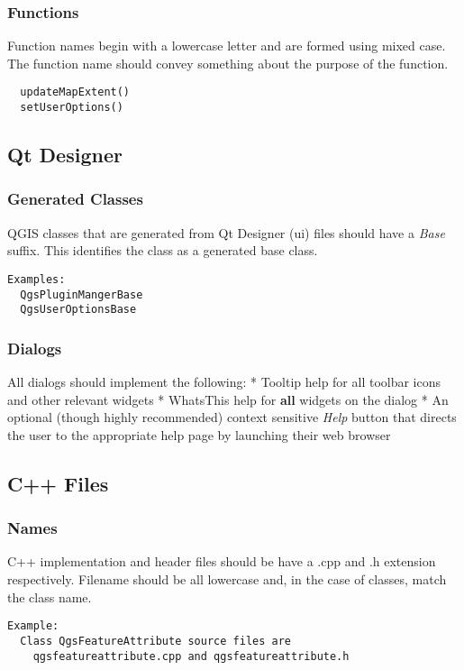 \subsubsection{Functions}
Function names begin with a lowercase letter and are formed using mixed case.
The function name should convey something about the purpose of the function.

\begin{verbatim}
  updateMapExtent()
  setUserOptions()
\end{verbatim}

\subsection{Qt Designer}
\subsubsection{Generated Classes}
QGIS classes that are generated from Qt Designer (ui) files should have a
\textit{Base} suffix. This identifies the class as a generated base class.

\begin{verbatim}
Examples:
  QgsPluginMangerBase
  QgsUserOptionsBase
\end{verbatim}
\subsubsection{Dialogs}
All dialogs should implement the following:
 * Tooltip help for all toolbar icons and other relevant widgets
 * WhatsThis help for \textbf{all} widgets on the dialog
 * An optional (though highly recommended) context sensitive \textit{Help} button
   that directs the user to the appropriate help page by launching their web
   browser

\subsection{C++ Files}
\subsubsection{Names}
C++ implementation and header files should be have a .cpp and .h extension
respectively.  Filename should be all lowercase and, in the case of classes,
match the class name.

\begin{verbatim}
Example:
  Class QgsFeatureAttribute source files are 
    qgsfeatureattribute.cpp and qgsfeatureattribute.h
\end{verbatim}

